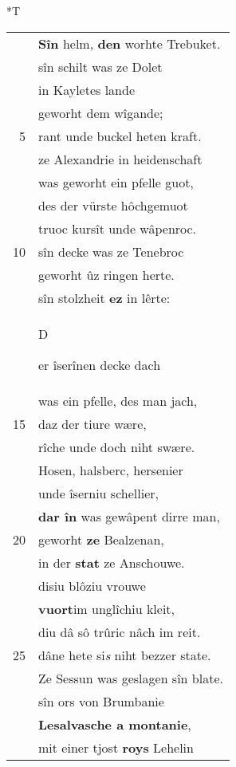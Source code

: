 \documentclass[8pt,a4paper,notitlepage]{article}
\begin{document}
\begin{table}[ht]
\begin{minipage}[t]{0.5\linewidth}
\end{minipage}
\hspace{0.5cm}
\begin{minipage}[t]{0.5\linewidth}
\small
\begin{center}*T
\end{center}
\begin{tabular}{rl}
 & \textbf{Sîn} helm, \textbf{den} worhte Trebuket.\\ 
 & sîn schilt was ze Dolet\\ 
 & in Kayletes lande\\ 
 & geworht dem wîgande;\\ 
5 & rant unde buckel heten kraft.\\ 
 & ze Alexandrie in heidenschaft\\ 
 & was geworht ein pfelle guot,\\ 
 & des der vürste hôchgemuot\\ 
 & truoc kursît unde wâpenroc.\\ 
10 & sîn decke was ze Tenebroc\\ 
 & geworht ûz ringen herte.\\ 
 & sîn stolzheit \textbf{ez} in lêrte:\\ 
 & \begin{large}D\end{large}er îserînen decke dach\\ 
 & was ein pfelle, des man jach,\\ 
15 & daz der tiure wære,\\ 
 & rîche unde doch niht swære.\\ 
 & Hosen, halsberc, hersenier\\ 
 & unde îserniu schellier,\\ 
 & \textbf{dar în} was gewâpent dirre man,\\ 
20 & geworht \textbf{ze} Bealzenan,\\ 
 & in der \textbf{stat} ze Anschouwe.\\ 
 & disiu blôziu vrouwe\\ 
 & \textbf{vuort}im unglîchiu kleit,\\ 
 & diu dâ sô trûric nâch im reit.\\ 
25 & dâne hete si\textit{s} niht bezzer state.\\ 
 & Ze Sessun was geslagen sîn blate.\\ 
 & sîn ors von Brumbanie\\ 
 & \textbf{Lesalvasche a montanie},\\ 
 & mit einer tjost \textbf{roys} Lehelin\\ 

\end{tabular}
\end{minipage}
\end{table}
\end{document}
